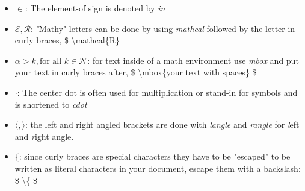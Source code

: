 \begin{itemize}
    \item $\in$: The element-of sign is denoted by \textit{in}
    \item $\mathcal{E}, \mathcal{R}$: "Mathy" letters can be done by using \textit{mathcal} followed by the letter in curly braces, \$ \textbackslash mathcal\{R\}
    \item $\alpha > k, \mbox{for all } k \in \mathcal{N}$: for text inside of a math environment use \textit{mbox} and put your text in curly braces after, \$ \textbackslash mbox\{your text with spaces\} \$
    \item $\cdot$: The center dot is often used for multiplication or stand-in for symbols and is shortened to \textit{cdot}
    \item $\langle , \rangle$: the left and right angled brackets are done with \textit{langle} and \textit{rangle} for \textit{l}eft and \textit{r}ight angle.
    \item $\{$: since curly braces are special characters they have to be "escaped" to be written as literal characters in your document, escape them with a backslash: \$ \textbackslash \{ \$
\end{itemize}
